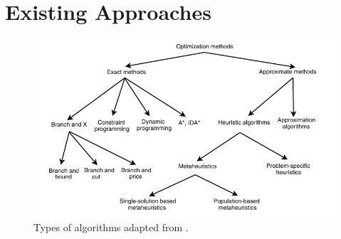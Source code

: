 \section{Existing Approaches}
\label{section:ExistingAppr}
\begin{figure}[h!]
 \centering
   \includegraphics{./images/typesOfAlgorithms}
   \caption{Types of algorithms adapted from \cite{Talbi2009}.}
   \label{fig:TypesAlgorithms}
\end{figure}

